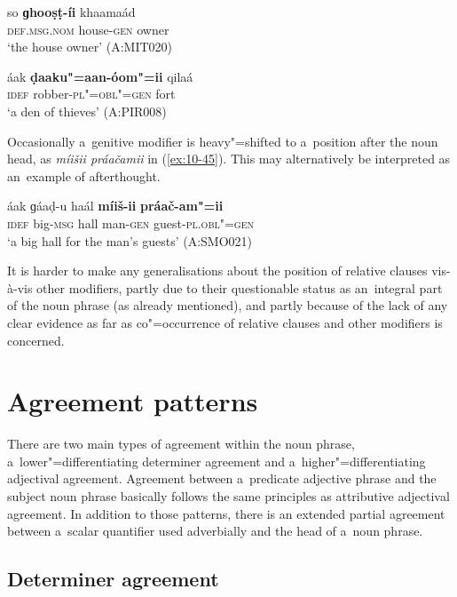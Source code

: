 \begin{exe}
\ex
\label{ex:10-43}
\gll so \textbf{ɡhooṣṭ-íi} khaamaád \\
\textsc{def.msg.nom} house-\textsc{gen} owner  \\
\glt `the house owner' (A:MIT020)

\ex
\label{ex:10-44}
\gll áak \textbf{ḍaaku"=aan-óom"=ii} qilaá  \\
\textsc{idef} robber-\textsc{pl"=obl"=gen} fort  \\
\glt `a den of thieves' (A:PIR008)
\end{exe}


Occasionally a~genitive modifier is heavy"=shifted to a~position after the noun head, as \textit{míišii práačamii} in (\ref{ex:10-45}). This may alternatively be interpreted as an~example of afterthought.

\begin{exe}
\ex
\label{ex:10-45}
\gll áak ɡáaḍ-u haál \textbf{míiš-ii} \textbf{práač-am"=ii} \\
\textsc{idef} big-\textsc{msg} hall man-\textsc{gen} guest-\textsc{pl.obl"=gen}  \\
\glt `a big hall for the man's guests' (A:SMO021)
\end{exe}


It is harder to make any generalisations about the position of relative clauses vis-à-vis other modifiers, partly due to their questionable status as an~integral part of the noun phrase (as already mentioned), and partly because of the lack of any clear evidence as far as co"=occurrence of relative clauses and other modifiers is concerned.


\section{Agreement patterns}
\label{sec:10-3}

There are two main types of agreement within the noun phrase, a~lower"=differentiating determiner agreement and a~higher"=differentiating adjectival agreement. Agreement between a~predicate adjective phrase and the subject noun phrase basically follows the same principles as attributive adjectival agreement. In addition to those patterns, there is an extended partial agreement between a~scalar quantifier used adverbially and the head of a~noun phrase.


\subsection{Determiner agreement}
\label{subsec:10-3-1}


